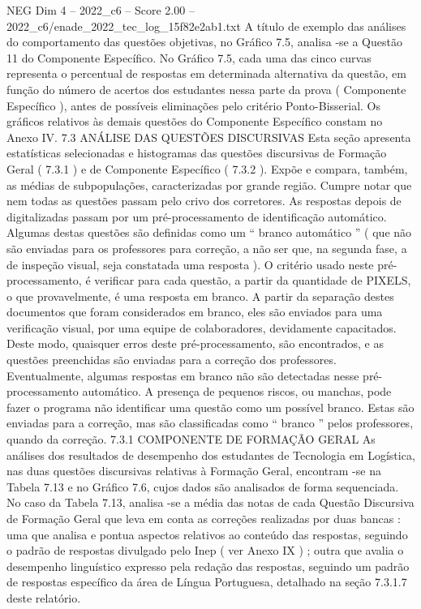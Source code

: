 \begin{textsample}{NEG Dim 4 – 2022\_c6 – Score 2.00 – 2022\_c6/enade\_2022\_tec\_log\_15f82e2ab1.txt}
A título de exemplo das análises do comportamento das questões objetivas, no Gráfico 7.5, analisa -se a Questão 11 do Componente Específico.
No Gráfico 7.5, cada uma das cinco curvas representa o percentual de respostas em determinada alternativa da questão, em função do número de acertos dos estudantes nessa parte da prova ( Componente Específico ), antes de possíveis eliminações pelo critério Ponto-Bisserial.
Os gráficos relativos às demais questões do Componente Específico constam no Anexo IV. 7.3 ANÁLISE DAS QUESTÕES DISCURSIVAS Esta seção apresenta estatísticas selecionadas e histogramas das questões discursivas de Formação Geral ( 7.3.1 ) e de Componente Específico ( 7.3.2 ).
Expõe e compara, também, as médias de subpopulações, caracterizadas por grande região.
Cumpre notar que nem todas as questões passam pelo crivo dos corretores.
As respostas depois de digitalizadas passam por um pré-processamento de identificação automático.
Algumas destas questões são definidas como um “ branco automático ” ( que não são enviadas para os professores para correção, a não ser que, na segunda fase, a de inspeção visual, seja constatada uma resposta ).
O critério usado neste pré-processamento, é verificar para cada questão, a partir da quantidade de PIXELS, o que provavelmente, é uma resposta em branco.
A partir da separação destes documentos que foram considerados em branco, eles são enviados para uma verificação visual, por uma equipe de colaboradores, devidamente capacitados.
Deste modo, quaisquer erros deste pré-processamento, são encontrados, e as questões preenchidas são enviadas para a correção dos professores.
Eventualmente, algumas respostas em branco não são detectadas nesse pré-processamento automático.
A presença de pequenos riscos, ou manchas, pode fazer o programa não identificar uma questão como um possível branco.
Estas são enviadas para a correção, mas são classificadas como “ branco ” pelos professores, quando da correção. 7.3.1 COMPONENTE DE FORMAÇÃO GERAL As análises dos resultados de desempenho dos estudantes de Tecnologia em Logística, nas duas questões discursivas relativas à Formação Geral, encontram -se na Tabela 7.13 e no Gráfico 7.6, cujos dados são analisados de forma sequenciada.
No caso da Tabela 7.13, analisa -se a média das notas de cada Questão Discursiva de Formação Geral que leva em conta as correções realizadas por duas bancas : uma que analisa e pontua aspectos relativos ao conteúdo das respostas, seguindo o padrão de respostas divulgado pelo Inep ( ver Anexo IX ) ; outra que avalia o desempenho linguístico expresso pela redação das respostas, seguindo um padrão de respostas específico da área de Língua Portuguesa, detalhado na seção 7.3.1.7 deste relatório.

\end{textsample}
